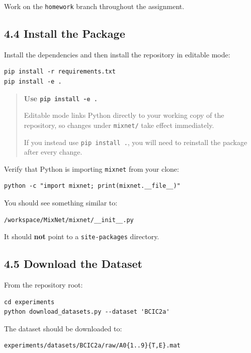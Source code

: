 \documentclass[
  10pt,
]{article}
\begin{document}
Work on the \texttt{homework} branch throughout the assignment.

\subsection{4.4 Install the Package}\label{install-the-package}

Install the dependencies and then install the repository in editable
mode:

\begin{verbatim}
pip install -r requirements.txt
pip install -e .
\end{verbatim}

\begin{quote}
\textbf{Use \texttt{pip install -e .}}

Editable mode links Python directly to your working copy of the
repository, so changes under \texttt{mixnet/} take effect immediately.

If you instead use \texttt{pip install .}, you will need to reinstall
the package after every change.
\end{quote}

Verify that Python is importing \texttt{mixnet} from your clone:

\begin{verbatim}
python -c "import mixnet; print(mixnet.__file__)"
\end{verbatim}

You should see something similar to:

\begin{verbatim}
/workspace/MixNet/mixnet/__init__.py
\end{verbatim}

It should \textbf{not} point to a \texttt{site-packages} directory.

\subsection{4.5 Download the Dataset}\label{download-the-dataset}

From the repository root:

\begin{verbatim}
cd experiments
python download_datasets.py --dataset 'BCIC2a'
\end{verbatim}

The dataset should be downloaded to:

\begin{verbatim}
experiments/datasets/BCIC2a/raw/A0{1..9}{T,E}.mat
\end{verbatim}
\end{document}
